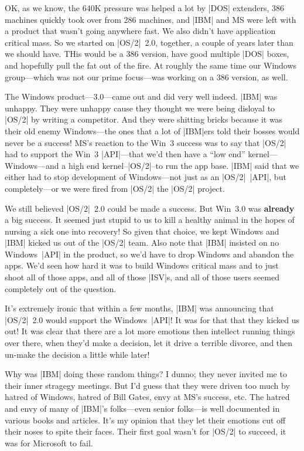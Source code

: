 OK, as we know, the 640K pressure was helped a lot by |DOS| extenders,
386 machines quickly took over from 286 machines, and |IBM| and MS were
left with a product that wasn't going anywhere fast.  We also didn't
have application critical mass.  So we started on |OS/2|~2.0, together,
a couple of years later than we should have.  THis would be a 386
version, have good multiple |DOS| boxes, and hopefully pull the fat out of
the fire.  At roughly the same time our Windows group---which was not
our prime focus---was working on a 386 version, as well.

The Windows product---3.0---came out and did very well indeed.  |IBM|
was unhappy.  They were unhappy cause they thought we were being disloyal
to |OS/2| by writing a competitor.  And they were shitting bricks because it
was their old enemy Windows---the ones that a lot of |IBM|ers
told their bosses would never be a success!  MS's reaction to the Win~3
success was to say that |OS/2| had to support the Win~3 |API|---that we'd
then have a ``low end'' kernel---Windows---and a high end kernel--|OS/2|--to
run the app base.  |IBM| said that we either had to stop development of
Windows---not just as an |OS/2|~|API|, but completely---or
we were fired from |OS/2| the |OS/2| project.

We still believed |OS/2|~2.0 could be made a success.  But Win~3.0 was
{\bf already} a big success.  It seemed just stupid to us to kill a healthy
animal in the hopes of nursing a sick one into recovery!  So given that
choice, we kept Windows and |IBM| kicked us out of the |OS/2| team.  Also
note that |IBM| insisted on no Windows~|API| in the product, so we'd have
to drop Windows and abandon the apps.  We'd seen how hard it was to
build Windows critical mass and to just shoot all of those apps, 
and all of those |ISV|s, and all of those users seemed completely out of
the question.

It's extremely ironic that within a few months, |IBM| was announcing that
|OS/2|~2.0 would support the Windows~|API|!  It was for that that they
kicked us out!  It was clear that there are a lot more emotions then
intellect running things over there, when they'd make a decision, let
it drive a terrible divorce, and then un-make the decision a little while
later!  

Why was |IBM| doing these random things?  I dunno; they never invited me to
their inner stragegy meetings.  But I'd guess that they were driven too
much by hatred of Windows, hatred of Bill Gates, envy at MS's success, etc.
The hatred and envy of many of |IBM|'s folks---even senior folks---is well
documented in various books and articles.  It's my opinion that they
let their emotions cut off their noses to spite their faces.  Their first
goal wasn't for |OS/2| to succeed, it was for Microsoft to fail.

